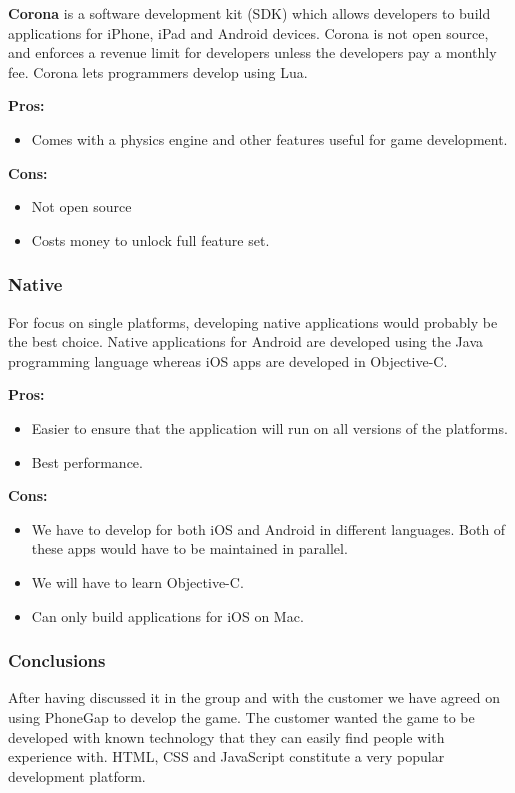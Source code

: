 \noindent
{\bf Corona} is a software development kit (SDK) which allows developers to
build applications for iPhone, iPad and Android devices. Corona is not open
source, and enforces a revenue limit for developers unless the developers pay a
monthly fee. Corona lets programmers develop using Lua.

\indent
  {\bf Pros:}
  \begin{itemize}
    \item Comes with a physics engine and other features useful for game
          development.
  \end{itemize}

\indent
  {\bf Cons:}
  \begin{itemize}
    \item Not open source
    \item Costs money to unlock full feature set.
  \end{itemize}

\subsubsection{Native}
For focus on single platforms, developing native applications would probably be
the best choice. Native applications for Android are developed using the Java
programming language whereas iOS apps are developed in Objective-C.

\indent
  {\bf Pros:}
  \begin{itemize}
    \item Easier to ensure that the application will run on all versions of
          the platforms.
    \item Best performance.
  \end{itemize}

\indent
  {\bf Cons:}
  \begin{itemize}
    \item We have to develop for both iOS and Android in different languages.
          Both of these apps would have to be maintained in parallel.
    \item We will have to learn Objective-C.
    \item Can only build applications for iOS on Mac.
  \end{itemize}

\noindent
\subsubsection{Conclusions}
After having discussed it in the group and with the customer we have agreed
on using PhoneGap to develop the game. The customer wanted the game to
be developed with known technology that they can easily find people with
experience with. HTML, CSS and JavaScript constitute a very popular development
platform.
